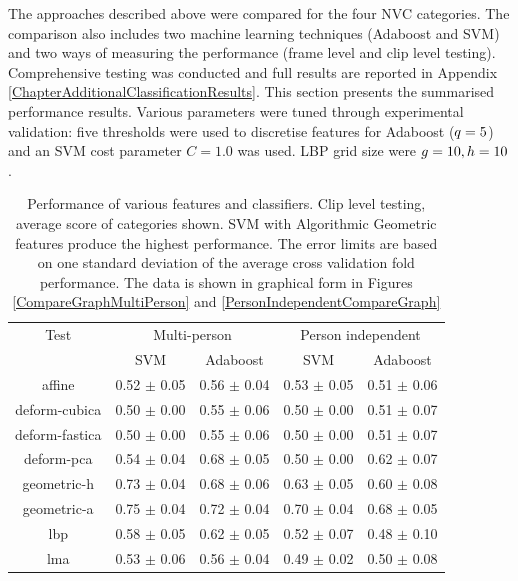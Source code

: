 The \featureGeneration approaches described above were compared for the four \ac{NVC} categories. The comparison also includes two machine learning techniques (Adaboost and \ac{SVM}) and two ways of measuring the performance (frame level and clip level testing). Comprehensive testing was conducted and full results are reported in Appendix \ref{ChapterAdditionalClassificationResults}. This section presents the summarised performance results. 
Various parameters were tuned through experimental validation: five thresholds were used to discretise features for Adaboost ($q = 5$) and an \ac{SVM} cost parameter $C=1.0$ was used. LBP grid size were $g=10, h=10$.

\begin{table}[tb]
\centering
\caption[\ac{AUC} Performance of various features and classifiers.]{Performance of various features and classifiers. Clip level testing, average score of categories shown. \ac{SVM} with Algorithmic Geometric features produce the highest performance. The error limits are based on one standard deviation of the average cross validation fold performance. The data is shown in graphical form in Figures \ref{CompareGraphMultiPerson} and \ref{PersonIndependentCompareGraph}}
\begin{tabular}{ c | c | c | c | c }
\hline
Test & \multicolumn{2}{c|}{Multi-person} & \multicolumn{2}{c}{Person independent} \\
 & SVM & Adaboost & SVM & Adaboost \\
\hline
affine 					& 0.52 $\pm$ 0.05 & 0.56 $\pm$ 0.04 & 0.53 $\pm$ 0.05 & 0.51 $\pm$ 0.06\\
deform-cubica 				& 0.50 $\pm$ 0.00 & 0.55 $\pm$ 0.06 & 0.50 $\pm$ 0.00 & 0.51 $\pm$ 0.07\\
deform-fastica 				& 0.50 $\pm$ 0.00 & 0.55 $\pm$ 0.06 & 0.50 $\pm$ 0.00 & 0.51 $\pm$ 0.07\\
deform-pca 				& 0.54 $\pm$ 0.04 & 0.68 $\pm$ 0.05 & 0.50 $\pm$ 0.00 & 0.62 $\pm$ 0.07\\
geometric-h 				& 0.73 $\pm$ 0.04 & 0.68 $\pm$ 0.06 & 0.63 $\pm$ 0.05 & 0.60 $\pm$ 0.08\\
\rowcolor[gray]{.95} geometric-a	& 0.75 $\pm$ 0.04 & 0.72 $\pm$ 0.04 & 0.70 $\pm$ 0.04 & 0.68 $\pm$ 0.05\\
lbp 					& 0.58 $\pm$ 0.05 & 0.62 $\pm$ 0.05 & 0.52 $\pm$ 0.07 & 0.48 $\pm$ 0.10\\
lma 					& 0.53 $\pm$ 0.06 & 0.56 $\pm$ 0.04 & 0.49 $\pm$ 0.02 & 0.50 $\pm$ 0.08\\
\hline
\end{tabular}
\label{TableCompareFeaturesAndClassifiers}
\end{table}

